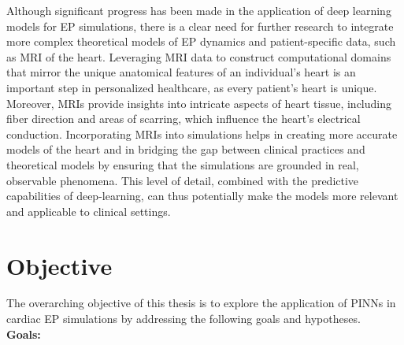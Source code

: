 Although significant progress has been made in the application of deep learning models for EP simulations, there is a clear need for further research to integrate more complex theoretical models of EP dynamics and patient-specific data, such as MRI of the heart. Leveraging MRI data to construct computational domains that mirror the unique anatomical features of an individual's heart is an important step in personalized healthcare, as every patient's heart is unique. Moreover, MRIs provide insights into intricate aspects of heart tissue, including fiber direction and areas of scarring, which influence the heart's electrical conduction. Incorporating MRIs into simulations helps in creating more accurate models of the heart and in bridging the gap between clinical practices and theoretical models by ensuring that the simulations are grounded in real, observable phenomena. This level of detail, combined with the predictive capabilities of deep-learning, can thus potentially make the models more relevant and applicable to clinical settings.


\section{Objective}
The overarching objective of this thesis is to explore the application of PINNs in cardiac EP simulations by addressing the following goals and hypotheses.\\

\textbf{Goals:}

